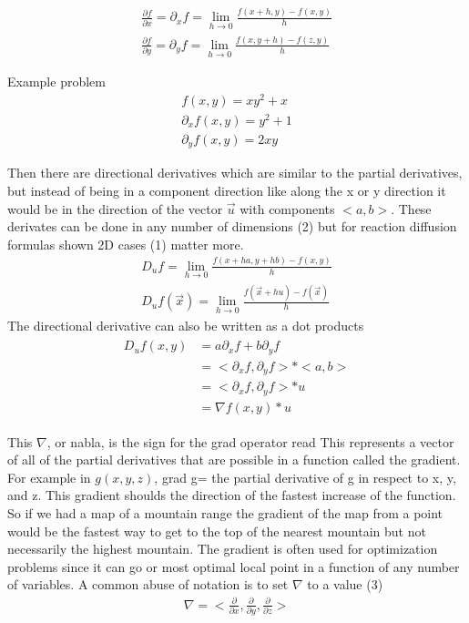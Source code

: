 \documentclass[12pt]{article}
\begin{document}
\begin{gather}
 \frac{\partial f}{\partial x} = \partial_x{f} = \lim_{h \to 0} \frac{f(x+h, y) − f(x,y)}{h} \\
 \frac{\partial f}{\partial y} = \partial_y{f} = \lim_{h \to 0} \frac{f(x, y + h) − f(z,y)}{h}
\end{gather}

\begin{center}
 Example problem
 \begin{gather*}
  f(x, y) = xy^2 + x \\
  \partial_x f(x,y) = y^2 + 1 \\
  \partial_y f(x,y) = 2xy
 \end{gather*}
\end{center}

Then there are directional derivatives which are similar to the partial derivatives, but instead of being in a
component direction like along the x  or y direction it would be in the direction of the vector $\vec{u}$ with
components $ <a, b> $. These derivates can be done in any number of dimensions (2) but for reaction diffusion
formulas shown 2D cases (1) matter more.
\begin{gather}
  D_u f = \lim_{h \to 0} \frac{f(x + ha, y+ hb) − f(x, y)}{h}  \\
  D_u{f(\vec{x})} = \lim_{h \to 0} \frac{f(\vec{x} + hu) − f(\vec{x})}{h}
\end{gather}
The directional derivative can also be written as a dot products
\begin{gather*}
\begin{aligned}
  D_u f(x,y) &= a\partial_x f + b\partial_y f \\
             &= <\partial_x f, \partial_y f> * <a, b> \\
             &= <\partial_x f, \partial_y f> * u \\
             &= \nabla f(x,y) * u 
\end{aligned}
\end{gather*}

This $\nabla$, or nabla, is the sign for the grad operator read  This represents a vector of all
of the partial derivatives that are possible in a function called the gradient. For example in $g(x, y, z)$,
grad g= the partial derivative of g in respect to x, y, and z. This gradient shoulds the direction of the
fastest increase of the function. So if we had a map of a mountain range the gradient of the map from a
point would be the fastest way to get to the top of the nearest mountain but not necessarily the highest
mountain. The gradient is often used for optimization problems since it can go  or most
optimal local  point in a function of any number of variables. A common abuse of notation is to set $\nabla$
to a value (3)
\begin{gather}
  \nabla = <\frac{\partial}{\partial x}, \frac{\partial}{\partial y}, \frac{\partial}{\partial z}>
\end{gather}
\end{document}
